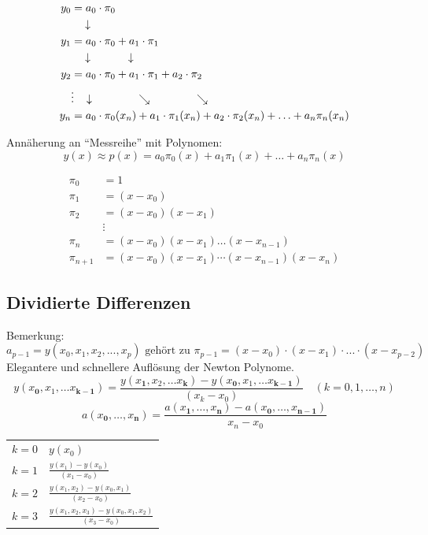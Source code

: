 \begin{minipage}[t]{7.5cm}
	\begin{align}
		y_0 &= a_0\cdot \pi_0 \nonumber\\
		&\quad \downarrow\nonumber\\
		y_1 &= a_0\cdot \pi_0 +a_1\cdot\pi_1 \nonumber\\
		&\quad \downarrow \hspace{1.2cm}\downarrow\nonumber\\
		y_2 &= a_0\cdot \pi_0 +a_1\cdot\pi_1  +a_2\cdot\pi_2  \nonumber\\
		&\vdots\hspace{0.3cm}\downarrow \hspace{1.5cm}\searrow\hspace{1.5cm}\searrow\nonumber\\
		y_n &= a_0\cdot \pi_0(x_n) +a_1\cdot\pi_1(x_n)  +a_2\cdot\pi_2(x_n)+\ldots+ a_n\pi_n(x_n) \nonumber
	\end{align}

	Annäherung an ``Messreihe'' mit Polynomen: $$y(x)\approx p(x) = a_0 \pi_0(x) + a_1 \pi_1(x) + \ldots+ a_{n} \pi_{n}(x)$$
\end{minipage}
\hfill
\begin{minipage}[t]{11.5cm}
	\begin{align}
		\pi_0 &= 1 \nonumber\\
		\pi_1 &= (x-x_0) \nonumber\\
		\pi_2 &= (x-x_0)(x-x_1) \nonumber\\
		&\vdots \nonumber\\
		\pi_n &= (x-x_0)(x-x_1)\ldots(x-x_{n-1}) \nonumber\\
		\pi_{n+1} &= (x-x_0)(x-x_1)\cdots(x-x_{n-1})(x-x_n) \nonumber
	\end{align}	
\end{minipage}

\subsection{Dividierte Differenzen}
Bemerkung:
\[
	a_{p-1} = y(x_0,x_1,x_2, ... , x_p) \text{ gehört zu } \pi_{p-1}=(x-x_0)\cdot(x-x_1)\cdot ... \cdot (x-x_{p-2})
\]
Elegantere und schnellere Auflösung der Newton Polynome.
$$y(x_\mathbf{0}, x_1, \ldots x_\mathbf{k-1}) = \frac{y(x_\mathbf{1},x_2,\ldots x_\mathbf{k})-y(x_\mathbf{0},x_1,\ldots x_{\mathbf{k-1}})}{(x_k-x_0)} \quad (k=0,1,\ldots,n)$$
$$a(x_\mathbf{0},\ldots,x_\mathbf{n})=\frac{a(x_\mathbf{1},\ldots,x_\mathbf{n})-a(x_\mathbf{0},\ldots,x_{\mathbf{n-1}})}{x_n-x_0}$$
\begin{tabular}{ll}
$k=0$ &$y(x_0)$ \\[0.2cm]
$k=1$ &$\frac{y(x_1)-y(x_0)}{(x_1-x_0)}$\\[0.2cm]
$k=2$ &$\frac{y(x_1,x_2)-y(x_0,x_1)}{(x_2-x_0)}$\\[0.2cm]
$k=3$ &$\frac{y(x_1,x_2,x_3)-y(x_0,x_1,x_2)}{(x_3-x_0)}$\\
\end{tabular}\\
\\

